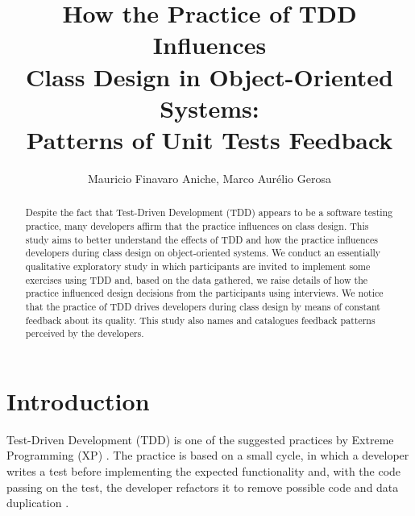 \documentclass[times]{elsarticle}
\begin{document}
\title{How the Practice of TDD Influences \\Class Design in Object-Oriented Systems: \\Patterns of Unit Tests Feedback}

\author{Mauricio Finavaro Aniche, Marco Aurélio Gerosa}

\address{
	Department of Computer Sciences\\ 
	Institute of Mathematics and Statistics\\ 
	University of São Paulo (USP)\\ 
	PO Box 66.281 - 05.508-090 - São Paulo - SP - Brazil\\
}

\begin{abstract}

	Despite the fact that Test-Driven Development (TDD) appears to be a software testing practice, 
	many developers affirm that the practice influences on class design. This study aims
	to better understand the effects of TDD and how the practice influences developers
	during class design on object-oriented systems. 
	We conduct an essentially qualitative exploratory study in which participants
	are invited to implement some exercises using TDD and, based on the data gathered,
	we raise details of how the practice influenced design decisions from the
	participants using interviews.
	We notice that the practice of TDD drives
	developers during class design by means of constant feedback about its quality. This study
	also names and catalogues feedback patterns perceived by the developers.
	
\end{abstract}

\maketitle

\section{Introduction}

Test-Driven Development (TDD) is one of the suggested practices
by Extreme Programming (XP) \cite{XPExplained}. The practice is based on
a small cycle, in which a developer writes a test before implementing
the expected functionality and, with the code passing on the
test, the developer refactors it to remove possible code 
and data duplication \cite{TDDByExample}.
\end{document}

